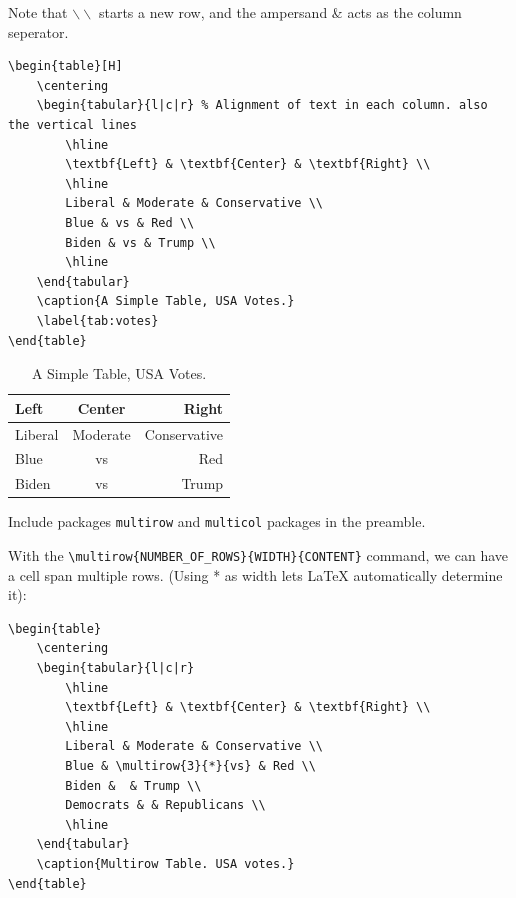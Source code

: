 \documentclass{article}
\theoremstyle{remark}
\begin{document}
    Note that $\backslash \backslash$ starts a new row, and the ampersand \& acts as the column seperator.

\begin{lstlisting}
\begin{table}[H]
    \centering
    \begin{tabular}{l|c|r} % Alignment of text in each column. also the vertical lines
        \hline
        \textbf{Left} & \textbf{Center} & \textbf{Right} \\
        \hline
        Liberal & Moderate & Conservative \\
        Blue & vs & Red \\
        Biden & vs & Trump \\
        \hline
    \end{tabular}
    \caption{A Simple Table, USA Votes.}
    \label{tab:votes}
\end{table}
\end{lstlisting}

\begin{table}[H]
    \centering
    \begin{tabular}{l|c|r} %
        \hline
        \textbf{Left} & \textbf{Center} & \textbf{Right} \\
        \hline
        Liberal & Moderate & Conservative \\
        Blue & vs & Red \\
        Biden & vs & Trump \\
        \hline
    \end{tabular}
    \caption{A Simple Table, USA Votes.}
    \label{tab:votes}
\end{table}

    Include packages \verb!multirow! and \verb!multicol! packages in the preamble.
    
    With the \verb!\multirow{NUMBER_OF_ROWS}{WIDTH}{CONTENT}! command, we can 
    have a cell span multiple rows. (Using * as width lets \LaTeX{} automatically
    determine it):
\begin{lstlisting}
\begin{table}
    \centering
    \begin{tabular}{l|c|r}
        \hline
        \textbf{Left} & \textbf{Center} & \textbf{Right} \\
        \hline
        Liberal & Moderate & Conservative \\
        Blue & \multirow{3}{*}{vs} & Red \\
        Biden &  & Trump \\
        Democrats & & Republicans \\
        \hline
    \end{tabular}
    \caption{Multirow Table. USA votes.}
\end{table}
\end{lstlisting}
\end{document}
